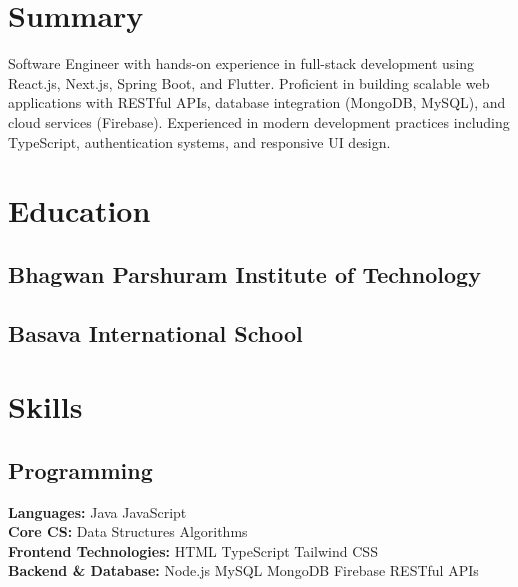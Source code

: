 \documentclass[]{deedy-resume-reversed}
\begin{document}
\begin{minipage}[t]{0.38\textwidth}

\section{Summary}
\raggedright 
Software Engineer with hands-on experience in full-stack development using React.js, Next.js, Spring Boot, and Flutter. Proficient in building scalable web applications with RESTful APIs, database integration (MongoDB, MySQL), and cloud services (Firebase). Experienced in modern development practices including TypeScript, authentication systems, and responsive UI design.
\sectionsep


\section{Education}

\subsection{Bhagwan Parshuram Institute of Technology}
\sectionsep

\subsection{Basava International School}
\sectionsep


\section{Skills}
\subsection{Programming}
\raggedright
 \textbf{Languages:} Java \textbullet{} JavaScript \\
\textbf{Core CS:} Data Structures \textbullet{} Algorithms  \\
\textbf{Frontend Technologies:}
HTML \textbullet{} TypeScript \textbullet{} Tailwind CSS \\
\textbf{Backend \& Database:}
Node.js \textbullet{} MySQL \textbullet{} MongoDB \textbullet{}
Firebase \textbullet{} RESTful APIs \\
\sectionsep


\end{minipage}
\end{document}
